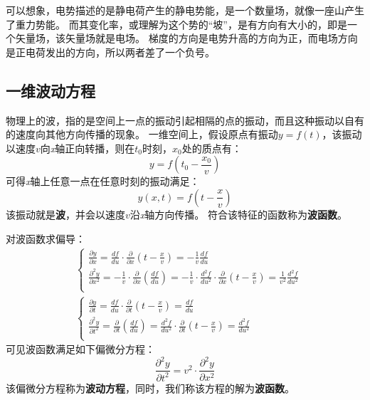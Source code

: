 可以想象，电势描述的是静电荷产生的静电势能，是一个数量场，就像一座山产生了重力势能。
而其变化率，或理解为这个势的“坡”，是有方向有大小的，即是一个矢量场，该矢量场就是电场。
梯度的方向是电势升高的方向为正，而电场方向是正电荷发出的方向，所以两者差了一个负号。

\subsection{一维波动方程}

物理上的波，指的是空间上一点的振动引起相隔的点的振动，而且这种振动以自有的速度向其他方向传播的现象。
一维空间上，假设原点有振动$y=f\left( t \right) $，该振动以速度$v$向{\it x}轴正向转播，则在$t_0$时刻，$x_0$处的质点有：
\[
y=f\left( t_0-\frac{x_0}{v} \right)
\]
可得{\it x}轴上任意一点在任意时刻的振动满足：
\[
y\left( x,t \right) =f\left( t-\frac{x}{v} \right)
\]
该振动就是{\bf 波}，并会以速度$v$沿{\it x}轴方向传播。
符合该特征的函数称为{\bf 波函数}。

对波函数求偏导：
\begin{align*}
&\begin{cases}
	\frac{\partial y}{\partial x}=\frac{df}{du}\cdot \frac{\partial}{\partial x}\left( t-\frac{x}{v} \right) =-\frac{1}{v}\frac{df}{du}\\
	\frac{\partial ^2y}{\partial x^2}=-\frac{1}{v}\cdot \frac{\partial}{\partial x}\left( \frac{df}{du} \right) =-\frac{1}{v}\cdot \frac{d^2f}{du^2}\cdot \frac{\partial}{\partial x}\left( t-\frac{x}{v} \right) =\frac{1}{v^2}\frac{d^2f}{du^2}\\
\end{cases} \\
&\begin{cases}
	\frac{\partial y}{\partial t}=\frac{df}{du}\cdot \frac{\partial}{\partial t}\left( t-\frac{x}{v} \right) =\frac{df}{du}\\
	\frac{\partial ^2y}{\partial t^2}=\frac{\partial}{\partial t}\left( \frac{df}{du} \right) =\frac{d^2f}{du^2}\cdot \frac{\partial}{\partial t}\left( t-\frac{x}{v} \right) =\frac{d^2f}{du^2}\\
\end{cases}
\end{align*}
可见波函数满足如下偏微分方程：
\[
\frac{\partial ^2y}{\partial t^2}=v^2\cdot \frac{\partial ^2y}{\partial x^2}
\]
该偏微分方程称为{\bf 波动方程}，同时，我们称该方程的解为{\bf 波函数}。




